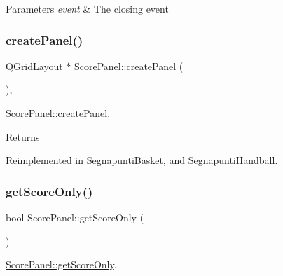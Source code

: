 \begin{DoxyParams}{Parameters}
{\em event} & The closing event \\
\hline
\end{DoxyParams}
\mbox{\label{classScorePanel_aae4f1b7b8ee1afc61ac53105f8657fdb}} 
\subsubsection{\texorpdfstring{create\+Panel()}{createPanel()}}
{\footnotesize\ttfamily Q\+Grid\+Layout $\ast$ Score\+Panel\+::create\+Panel (\begin{DoxyParamCaption}{ }\end{DoxyParamCaption})\hspace{0.3cm}{\ttfamily [protected]}, {\ttfamily [virtual]}}



\mbox{\hyperlink{classScorePanel_aae4f1b7b8ee1afc61ac53105f8657fdb}{Score\+Panel\+::create\+Panel}}. 

\begin{DoxyReturn}{Returns}

\end{DoxyReturn}


Reimplemented in \mbox{\hyperlink{classSegnapuntiBasket_a4fd8f038194cbb70dd732babc6ab3dfa}{Segnapunti\+Basket}}, and \mbox{\hyperlink{classSegnapuntiHandball_a9ec2eff0a86fe7fad3b03a0f013af603}{Segnapunti\+Handball}}.

\mbox{\label{classScorePanel_a2c2bba4095fa6ac83cb96913cc7dfd9f}} 
\subsubsection{\texorpdfstring{get\+Score\+Only()}{getScoreOnly()}}
{\footnotesize\ttfamily bool Score\+Panel\+::get\+Score\+Only (\begin{DoxyParamCaption}{ }\end{DoxyParamCaption})}



\mbox{\hyperlink{classScorePanel_a2c2bba4095fa6ac83cb96913cc7dfd9f}{Score\+Panel\+::get\+Score\+Only}}. 


